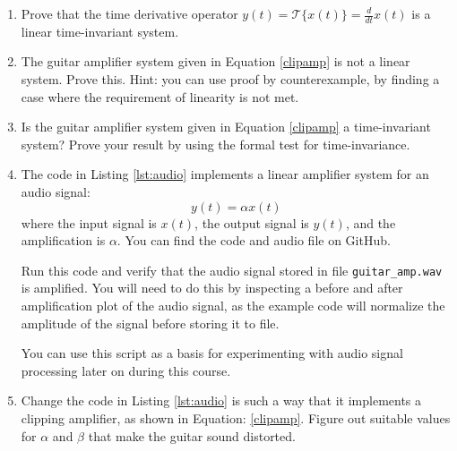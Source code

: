 \begin{enumerate}
  \item Prove that the time derivative operator $y(t) = \mathcal{T}\{x(t)\} = \frac{d}{dt} x(t)$
        is a linear time-invariant system.

  \item The guitar amplifier system given in Equation \ref{clipamp} is not a linear system.
        Prove this. Hint: you can use proof by counterexample, by finding a case where the requirement of linearity is not met.

  \item Is the guitar amplifier system given in Equation \ref{clipamp} a time-invariant system?
        Prove your result by using the formal test for time-invariance.

  \item The code in Listing \ref{lst:audio} implements a linear amplifier system for an audio signal:
        \begin{equation}
          y(t) = \alpha x(t)
        \end{equation}
        where the input signal is $x(t)$, the output signal is $y(t)$, and the amplification is $\alpha$.
        You can find the code and audio file on GitHub.
        
        Run this code and verify that the audio signal stored in
        file \verb|guitar_amp.wav| is amplified. You will need to do this by
        inspecting a before and after amplification plot of the audio signal,
        as the example code will normalize the amplitude of the signal before storing it to file.

        You can use this script as a basis for experimenting with audio signal processing later on during this course.

  \item Change the code in Listing \ref{lst:audio} is such a way that it implements a
        clipping amplifier, as shown in Equation: \ref{clipamp}. Figure out suitable
        values for $\alpha$ and $\beta$ that make the guitar sound distorted.

\end{enumerate}
